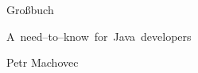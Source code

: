 \begin{titlepage}
    \vspace*{\fill}
    \begin{center}
        {\swabfamily\fontsize{90}{90}\selectfont Gro{\ss}buch\par}
        \vspace{10mm}
        \mbox{{\fontsize{20}{20}\selectfont A need--to--know for Java developers}}
        \vspace{30mm}
    \end{center}
    \vspace*{\fill}
    \begin{center}
        Petr Machovec
    \end{center}
\end{titlepage}
